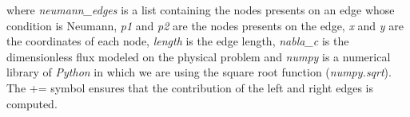 \noindent
where \textit{neumann\_edges} is a list containing the nodes 
presents on an edge whose condition is Neumann, \textit{p1} 
and \textit{p2} are the nodes presents on the edge, 
\textit{x} and \textit{y} are the coordinates of each node, 
\textit{length} is the edge length, \textit {nabla\_c} is the 
dimensionless flux modeled on the physical problem and 
\textit{numpy} is a numerical library of \textit{Python} 
in which we are using the square root function (\textit{numpy.sqrt}). 
The += symbol ensures that the contribution of the left and right 
edges is computed.
